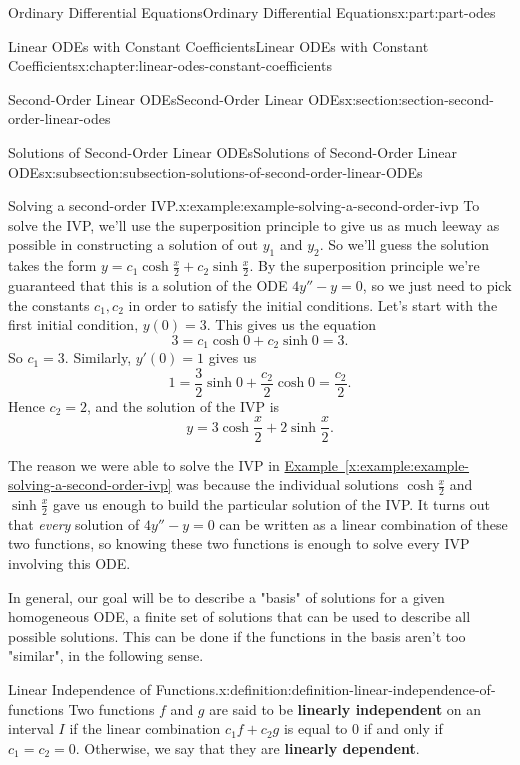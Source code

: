 \documentclass[twoside,10pt,]{book}
\newcommand{\xreffont}{\relax}
\newcommand{\terminology}[1]{\textbf{#1}}
\numberwithin{equation}{part}
\begin{document}
\begin{partptx}{Ordinary Differential Equations}{}{Ordinary Differential Equations}{}{}{x:part:part-odes}
\begin{chapterptx}{Linear ODEs with Constant Coefficients}{}{Linear ODEs with Constant Coefficients}{}{}{x:chapter:linear-odes-constant-coefficients}
\begin{sectionptx}{Second-Order Linear ODEs}{}{Second-Order Linear ODEs}{}{}{x:section:section-second-order-linear-odes}
\begin{subsectionptx}{Solutions of Second-Order Linear ODEs}{}{Solutions of Second-Order Linear ODEs}{}{}{x:subsection:subsection-solutions-of-second-order-linear-ODEs}
\begin{example}{Solving a second-order IVP.}{x:example:example-solving-a-second-order-ivp}
To solve the IVP, we'll use the superposition principle to give us as much leeway as possible in constructing a solution of out \(y_{1}\) and \(y_{2}\). So we'll guess the solution takes the form \(y = c_{1}\cosh\frac{x}{2} + c_{2}\sinh\frac{x}{2}\). By the superposition principle we're guaranteed that this is a solution of the ODE \(4y''-y=0\), so we just need to pick the constants \(c_{1},c_{2}\) in order to satisfy the initial conditions. Let's start with the first initial condition, \(y(0) = 3\). This gives us the equation%
\begin{equation*}
3 = c_{1}\cosh0+c_{2}\sinh0 = 3.
\end{equation*}
So \(c_{1} = 3\). Similarly, \(y'(0) = 1\) gives us%
\begin{equation*}
1 = \frac{3}{2}\sinh0+\frac{c_{2}}{2}\cosh0 = \frac{c_{2}}{2}.
\end{equation*}
Hence \(c_{2} = 2\), and the solution of the IVP is%
\begin{equation*}
y = 3\cosh\frac{x}{2} + 2\sinh\frac{x}{2}.
\end{equation*}
%
\end{example}
The reason we were able to solve the IVP in \hyperref[x:example:example-solving-a-second-order-ivp]{Example~{\xreffont\ref{x:example:example-solving-a-second-order-ivp}}} was because the individual solutions \(\cosh\frac{x}{2}\) and \(\sinh\frac{x}{2}\) gave us enough to build the particular solution of the IVP. It turns out that \emph{every} solution of \(4y''-y=0\) can be written as a linear combination of these two functions, so knowing these two functions is enough to solve every IVP involving this ODE.%
\par
In general, our goal will be to describe a "basis" of solutions for a given homogeneous ODE, a finite set of solutions that can be used to describe all possible solutions. This can be done if the functions in the basis aren't too "similar", in the following sense.%
\begin{definition}{Linear Independence of Functions.}{x:definition:definition-linear-independence-of-functions}%
%
Two functions \(f\) and \(g\) are said to be \terminology{linearly independent} on an interval \(I\) if the linear combination \(c_{1}f + c_{2}g\) is equal to \(0\) if and only if \(c_{1} = c_{2} = 0\). Otherwise, we say that they are \terminology{linearly dependent}.%
\end{definition}

\end{subsectionptx}
\end{sectionptx}
\end{chapterptx}
\end{partptx}
\end{document}
